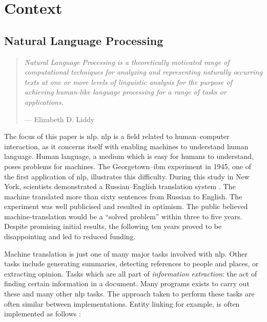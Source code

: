 \chapter{Context}\label{context}

\glsresetall

\section{Natural Language Processing}\label{natural-language-processing}

\begin{quote}
  \textit{Natural Language Processing is a theoretically motivated range
    of computational techniques for analyzing and representing
    naturally occurring texts at one or more levels of linguistic
    analysis for the purpose of achieving human-like language processing
    for a range of tasks or applications.
  }

  \medskip
  --- Elizabeth D. Liddy \autocite*{natural-language-processing-liddy-2001}
\end{quote}

\noindent The focus of this paper is \gls{nlp}.
\gls{nlp} is a field related to human--computer interaction, as it
  concerns itself with enabling machines to understand human language.
Human language, a medium which is easy for humans to understand, poses
  problems for machines.
The Georgetown--\gls{ibm} experiment in 1945, one of the first application
  of \gls{nlp}, illustrates this difficulty.
During this study in New York, scientists demonstrated a
  Russian--English translation system
  \autocite{hutchins-john-georgetown-ibm-system}.
The machine translated more than sixty sentences from Russian to English.
The experiment was well publicised and resulted in optimism.
The public believed machine-translation would be a ``solved problem'' within
  three to five years.
Despite promising initial results, the following ten years proved to be
  disappointing and led to reduced funding.

Machine translation is just one of many major tasks involved with \gls{nlp}.
Other tasks include generating summaries, detecting references to people
  and places, or extracting opinion.
Tasks which are all part of \emph{information extraction}: the act of finding
  certain information in a document.
Many programs exists to carry out these and many other \gls{nlp} tasks.
The approach taken to perform these tasks are often similar between
  implementations.
Entity linking for example, is often implemented as follows
  \autocite[according to][]{stanbol-enhancer-nlp}:

